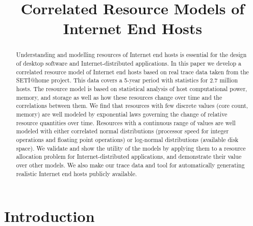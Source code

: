 \documentclass[conference]{IEEEtran}
\begin{document}
\title{Correlated Resource Models of Internet End Hosts}


\author{
\and
{}
}

\maketitle

\begin{abstract}
  Understanding and modelling resources of Internet end
  hosts is essential for the design of desktop software and
  Internet-distributed applications.  In this paper we
  develop a correlated resource model of Internet end hosts
  based on real trace data taken from the SETI@home project.
  This data covers a 5-year period with statistics for 2.7
  million hosts.  The resource model is based on statistical
  analysis of host computational power, memory, and storage
  as well as how these resources change over time and the
  correlations between them.  We find that resources with
  few discrete values (core count, memory) are well modeled
  by exponential laws governing the change of relative
  resource quantities over time.  Resources with a
  continuous range of values are well modeled with either
  correlated normal distributions (processor speed for
  integer operations and floating point operations) or
  log-normal distributions (available disk space). We
  validate and show the utility of the models by applying
  them to a resource allocation problem for
  Internet-distributed applications, and demonstrate their value
  over other models.  We also make our trace data
  and tool for automatically generating realistic Internet
  end hosts publicly available.
\end{abstract}

\IEEEpeerreviewmaketitle



\section{Introduction}
\end{document}
